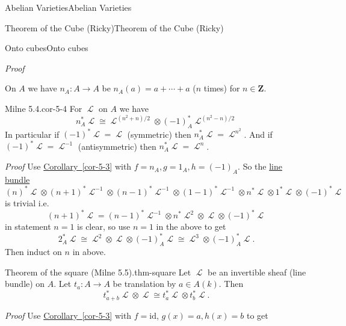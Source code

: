 \documentclass[10pt,]{book}
\makeatletter
\renewcommand*{\proofname}{Proof}
\renewenvironment{proof}[1][\proofname]{\par
  \pushQED{\qed}%
  \normalfont \topsep6\p@\@plus6\p@\relax
  \trivlist
  \item\relax
    {\itshape
    #1\@addpunct{.}}\hspace\labelsep\ignorespaces
}{%
  \popQED\endtrivlist\@endpefalse
}
\numberwithin{equation}{section}
\newcommand{\sheaf}[1]{\operatorname{\mathcal{#1}}}
\newcommand{\ZZ}{\mathbf{Z}}
\newcommand{\id}{\mathrm{id}}
\makeatother
\begin{document}
\begin{chapterptx}{Abelian Varieties}{}{Abelian Varieties}{}{}
\begin{sectionptx}{Theorem of the Cube (Ricky)}{}{Theorem of the Cube (Ricky)}{}{}
\begin{subsectionptx}{Onto cubes}{}{Onto cubes}{}{}
\begin{proof}
\end{proof}
\hypertarget{p-127}{}%
On \(A\) we have \(n_A \colon A\to A\) be \(n_A(a) = a+\cdots + a\) (\(n\) times) for \(n\in \ZZ\).%
\begin{corollary}{Milne 5.4.}{}{cor-5-4}%
\hypertarget{p-128}{}%
For \(\sheaf L\) on \(A\) we have%
\begin{equation*}
n^*_A\sheaf L \cong \sheaf L^{(n^2 + n)/2} \otimes (-1)_A^* \sheaf L^{(n^2 - n)/2}
\end{equation*}
In particular if \((-1)^* \sheaf L = \sheaf L\) (symmetric) then \(n_A^* \sheaf L = \sheaf L^{n^2}\). And if \((-1)^* \sheaf L = \sheaf L^{-1}\) (antisymmetric) then \(n_A^* \sheaf L = \sheaf L^{n}\).%
\end{corollary}
\begin{proof}\hypertarget{proof-21}{}
\hypertarget{p-129}{}%
Use \hyperref[cor-5-3]{Corollary~\ref{cor-5-3}} with \(f= n_A, g = 1_A, h = (-1)_A\). So the \hyperref[def-line-bundle]{line bundle}%
\begin{equation*}
(n)^*\sheaf L \otimes (n+1)^*\sheaf L^{-1}\otimes (n-1)^*\sheaf L^{-1}\otimes (1-1)^*\sheaf L^{-1} \otimes   n^*\sheaf L \otimes   1^*\sheaf L \otimes   (-1)^*\sheaf L
\end{equation*}
is trivial i.e.%
\begin{equation*}
(n+1)^*\sheaf L =  (n-1)^*\sheaf L^{-1}\otimes n^*\sheaf L^2 \otimes   \sheaf L \otimes   (-1)^*\sheaf L
\end{equation*}
in statement \(n = 1\) is clear, so use \(n=1\) in the above to get%
\begin{equation*}
2_A^*\sheaf L \cong \sheaf L^2 \otimes \sheaf L \otimes (-1)^*_A \sheaf L\cong \sheaf L^3 \otimes (-1)_A^*\sheaf  L\text{.}
\end{equation*}
Then induct on \(n\) in above.%
\end{proof}
\begin{theorem}{Theorem of the square (Milne 5.5).}{}{thm-square}%
\hypertarget{p-130}{}%
Let \(\sheaf L\) be an invertible sheaf (line bundle) on \(A\). Let \(t_a \colon A\to A\) be translation by \(a\in A(k)\). Then%
\begin{equation*}
t_{a+b}^*\sheaf L \otimes \sheaf L \cong t_a^*\sheaf L \otimes t_b^* \sheaf L\text{.}
\end{equation*}
%
\end{theorem}
\begin{proof}\hypertarget{proof-22}{}
\hypertarget{p-131}{}%
Use \hyperref[cor-5-3]{Corollary~\ref{cor-5-3}} with \(f=  \id\), \(g(x)  = a, h(x) = b\) to get%

\end{proof}
\end{subsectionptx}
\end{sectionptx}
\end{chapterptx}
\end{document}
